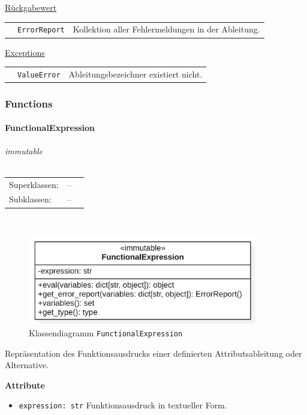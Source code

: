 \documentclass{article}
\newcommand{\classheader}[2][]{\paragraph{#2}
\mbox{}\textit{#1}\\\\}
\begin{document}
\begin{itemize}
\underline{{Rückgabewert}}

\begin{tabular}{lll}
 & \texttt{ErrorReport} & Kollektion aller Fehlermeldungen in der Ableitung. \\
\end{tabular}

\underline{Exceptions}\\
\begin{tabular}{lll}
 & \texttt{ValueError} & Ableitungsbezeichner existiert nicht.\\
\end{tabular}
\end{itemize}

\newpage
\subsubsection{Functions}
\classheader[\flqq{}immutable\frqq]{FunctionalExpression}\label{cls:FunctionalExpression}
\begin{tabular}{lll}
 Superklassen: & --\\
 Subklassen: & --\\
\end{tabular}\\
\begin{figure}[H]%
    \centering
    \includegraphics[width=10cm]{entwurf/Entwurf_dokument/img/cls/model/FunctionalExpression.png}
    \caption{Klassendiagramm \texttt{FunctionalExpression}}
\end{figure}

Repräsentation des Funktionsausdrucks einer definierten Attributsableitung oder Alternative.
\newline \newline

\textbf{{Attribute}}
\begin{itemize}
\item \texttt{expression: str} \newline Funktionsausdruck in textueller Form.
\\\\
\end{itemize}
\end{document}
